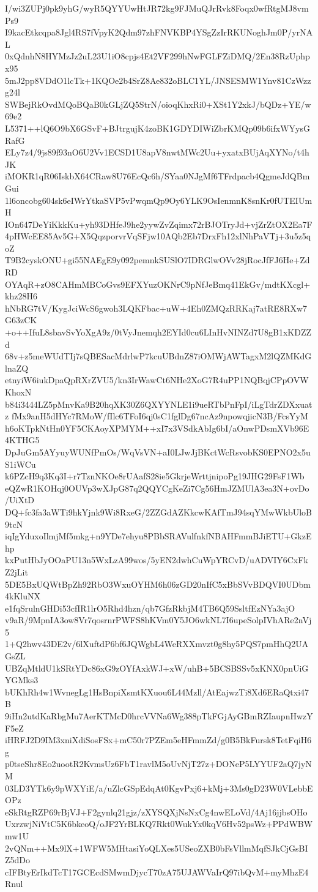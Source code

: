 I/wi3ZUPj0pk9yhG/wyR5QYYUwHtJR72kg9FJMuQJrRvk8Foqx0wfRtgMJ8vmPs9
I9kacEtkcqpa8Jgl4RS7fVpyK2Qdm97zhFNVKBP4YSgZzIrRKUNoghJm0P/yrNAL
0xQdnhN8HYMzJz2uL23U1iO8cpjs4Et2VF299hNwFGLFZiDMQ/2En38RzUphpx95
5mJ2pp8VDdO1lcTk+1KQOe2b4SrZ8Ae832oBLC1YL/JNSESMW1Ynv81CzWzzg24l
SWBejRkOvdMQoBQaB0kGLjZQ5StrN/oioqKhxRi0+XSt1Y2xkJ/bQDz+YE/w69e2
L5371++lQ6O9bX6GSvF+BJtrgujK4zoBK1GDYDIWiZbrKMQp09b6ifxWYysGRafG
ELy7z4/9js89f93nO6U2Vv1ECSD1U8apV8nwtMWc2Uu+yxatxBUjAqXYNo/t4hJK
iMOKR1qR06IskbX64CRaw8U76EcQc6h/SYaa0NJgMf6TFrdpacb4QgmeJdQBmGui
1l6oncobg604sk6eIWrYtkaSVP5vPwqmQp9Oy6YLK9OsIenmnK8snKr0fUTEIUmH
IOn647DeYiKkkKu+yh93DHfeJ9he2yywZvZqimx72rBJOTryJd+vjZrZtOX2Ea7F
4pHWcEE85Av5G+X5QqzporvrVqSFjw10AQb2Eb7DrxFh12xlNhPaVTj+3u5z5qoZ
T9B2cyskONU+gi55NAEgE9y092pemnkSUSlO7IDRGlwOVv28jRocJfFJ6He+ZdRD
OYAqR+zO8CAHmMBCoGvs9EFXYuzOKNrC9pNfJeBmq41EkGv/mdtKXcgl+khz28H6
hNbRG7tV/KygJciWcS6gwoh3LQKFbac+uW+4Eh0ZMQzRRKaj7atRE8RXw7G63zCK
+o++IfuL8sbavSvYoXgA9z/0tVyJnemqh2EYId0cu6LInHvNINZd7U8gB1xKDZZd
68v+z5meWUdTIj7sQBESacMdrlwP7kcuUBdnZ87iOMWjAWTagxM2lQZMKdGlnaZQ
etnyiW6iukDpaQpRXrZVU5/kn3IrWawCt6NHe2XoG7R4uPP1NQBqjCPpOVWKhoxN
b84i3444LZ5pMnvKa9B20hqXK30Z6QXYYNLE1i9ueRTbPnFpI/iLgTdrZDXxuatz
fMx9anH5dHYc7RMoW/fIlc6TFoI6qj0sC1fglDg67ncAz9npowqjicN3B/FcsYyM
h6oKTpkNtHn0YF5CKAoyXPMYM++xI7x3VSdkAbIg6bI/aOnwPDsmXVb96E4KTHG5
DpJuGm5AYyuyWUNfPmOs/WqVsVN+aI0LJwJjBKctWcRsvobKS0EPNO2x5uS1iWCu
k6PZcH9q3Kq3I+r7TznNKOe8rUAafS28ie5GkrjeWrttjnipoPg19JHG29FsF1Wb
eQZwR1KOHqj0OUVp3wXJpG87q2QQYCgKeZi7Cg56HmJZMUlA3ea3N+ovDo/UiXtD
DQ+fc3fa3aWTi9hkYjnk9Wi8RxeG/2ZZGdAZKkcwKAfTmJ94sqYMwWkbUloB9tcN
iqIgYduxoIlmjMf5mkg+n9YDe7ehyu8PBbSRAVulfnkfNBAHFmmBJiETU+GkzEhp
kxPutHbJyOOaPU13n5WxLzA99wos/5yEN2dwhCuWpYRCvD/uADVIY6CxFkZ2jLit
5DE5BxUQWtBpZh92RbO3WxuOYHM6h06zGD20nIfC5xBbSVvBDQVI0UDbm4kKluNX
e1fqSrulnGHDi53cfIR1lrO5Rhd4hzn/qb7GfzRkbjM4TB6Q59SsltfEzNYa3ajO
v9aR/9MpnIA3ow8Vr7qosrnrPWFS8hKVm0Y5JO6wkNL7I6upeSolpIVhARe2nVj5
1+Q2hwv43DE2v/6lXuftdP6bf6JQWgbL4WeRXXmvzt0g8hy5PQS7pmHhQ2UAGsZL
UBZqMtldU1kSRtYDc86xG9zOYfAxkWJ+xW/uhB+5BCSBSSv5xKNX0pnUiGYGMks3
bUKhRh4w1WvnegLg1HsBnpiXsmtKXuou6L44Mzll/AtEajwzTi8Xd6ERaQtxi47B
9iHn2utdKaRbgMu7AerKTMcD0hrcVVNa6Wg388pTkFGjAyGBmRZIaupnHwzYF5eZ
iHRFJ2D9IM3xniXdiSosFSx+mC50r7PZEm5eHFmmZd/g0B5BkFursk8TetFqiH6g
p0tseShr8Eo2uootR2KvmsUz6FbT1ravlM5oUvNjT27z+DONeP5LYYUF2aQ7jyNM
03LD3YTk6y9pWXYiE/a/uZlcGSpEdqAt0KgvPxj6+kMj+3Ms0gD23W0VLebbEOPz
eSkRtgRZP69rBjVJ+F2gynlq21gjz/zXYSQXjNsNxCg4nwELoVd/4Aj16jjbsOHo
UxrzwjNiVtC5K6bkeoQ/oJF2YrBLKQ7Rkt0WukYx0kqV6Hv52psWz+PPdWBWmw1U
2vQNm++Mx9lX+1WFW5MHtasiYoQLXes5USeoZXB0bFsVllmMqfSJkCjGsBIZ5dDo
cIFBtyErIkdTcT17GCEcdSMwmDjycT70zA75UJAWVaIrQ97ibQvM+myMhzE4Rnul
